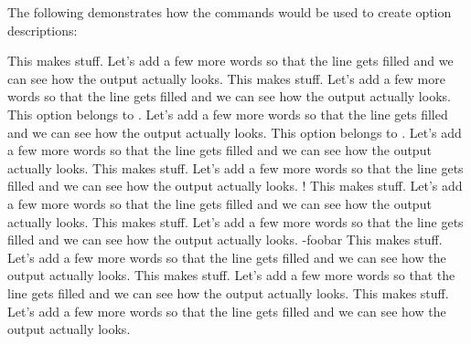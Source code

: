 \documentclass[load-preamble+]{cnltx-doc}
\begin{document}
The following demonstrates how the commands would be used to create option
descriptions:
\begin{sourcecode}
  \begin{options}
      This makes stuff.  Let's add a few more words so that the line gets
      filled and we can see how the output actually looks.
      This makes stuff.  Let's add a few more words so that the line gets
      filled and we can see how the output actually looks.
      This option belongs to .  Let's add a few more words so
      that the line gets filled and we can see how the output actually
      looks.
      This option belongs to .  Let's add a few more words so
      that the line gets filled and we can see how the output actually
      looks.
    \Default
      This makes stuff.  Let's add a few more words so that the line gets
      filled and we can see how the output actually looks.
    \Default!
      This makes stuff.  Let's add a few more words so that the line gets
      filled and we can see how the output actually looks.
      This makes stuff.  Let's add a few more words so that the line gets
      filled and we can see how the output actually looks.
    \keyval-{foo}{bar}
      This makes stuff.  Let's add a few more words so that the line gets
      filled and we can see how the output actually looks.
      This makes stuff.  Let's add a few more words so that the line gets
      filled and we can see how the output actually looks.
      This makes stuff.  Let's add a few more words so that the line gets
      filled and we can see how the output actually looks.
  \end{options}
\end{sourcecode}
\end{document}
